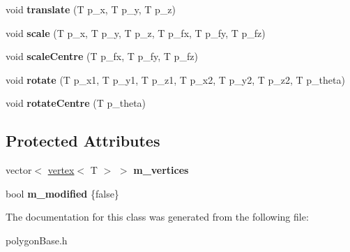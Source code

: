 \begin{DoxyCompactItemize}
\item 
\hypertarget{classpolygons_1_1polygon_a58b903988793c71055bc2177872164d3}{void {\bfseries translate} (T p\-\_\-x, T p\-\_\-y, T p\-\_\-z)}\label{classpolygons_1_1polygon_a58b903988793c71055bc2177872164d3}

\item 
\hypertarget{classpolygons_1_1polygon_aac0acb96427b60ed992c4d018e972cd5}{void {\bfseries scale} (T p\-\_\-x, T p\-\_\-y, T p\-\_\-z, T p\-\_\-fx, T p\-\_\-fy, T p\-\_\-fz)}\label{classpolygons_1_1polygon_aac0acb96427b60ed992c4d018e972cd5}

\item 
\hypertarget{classpolygons_1_1polygon_a7c9f38badf1fbbbdf3cc8529e039b395}{void {\bfseries scale\-Centre} (T p\-\_\-fx, T p\-\_\-fy, T p\-\_\-fz)}\label{classpolygons_1_1polygon_a7c9f38badf1fbbbdf3cc8529e039b395}

\item 
\hypertarget{classpolygons_1_1polygon_a14a41d7b439f852007a1d82eff7bdb50}{void {\bfseries rotate} (T p\-\_\-x1, T p\-\_\-y1, T p\-\_\-z1, T p\-\_\-x2, T p\-\_\-y2, T p\-\_\-z2, T p\-\_\-theta)}\label{classpolygons_1_1polygon_a14a41d7b439f852007a1d82eff7bdb50}

\item 
\hypertarget{classpolygons_1_1polygon_ac9f4a5413a9ccc98ac7788f9b92f01ab}{void {\bfseries rotate\-Centre} (T p\-\_\-theta)}\label{classpolygons_1_1polygon_ac9f4a5413a9ccc98ac7788f9b92f01ab}

\end{DoxyCompactItemize}
\subsection*{Protected Attributes}
\begin{DoxyCompactItemize}
\item 
\hypertarget{classpolygons_1_1polygon_a98f0e2c1c2a6b06f67b4211fe21127ed}{vector$<$ \hyperlink{classpolygons_1_1vertex}{vertex}$<$ T $>$ $>$ {\bfseries m\-\_\-vertices}}\label{classpolygons_1_1polygon_a98f0e2c1c2a6b06f67b4211fe21127ed}

\item 
\hypertarget{classpolygons_1_1polygon_a8bb0a52bc538b433819883316a507d92}{bool {\bfseries m\-\_\-modified} \{false\}}\label{classpolygons_1_1polygon_a8bb0a52bc538b433819883316a507d92}

\end{DoxyCompactItemize}


The documentation for this class was generated from the following file\-:\begin{DoxyCompactItemize}
\item 
polygon\-Base.\-h\end{DoxyCompactItemize}
